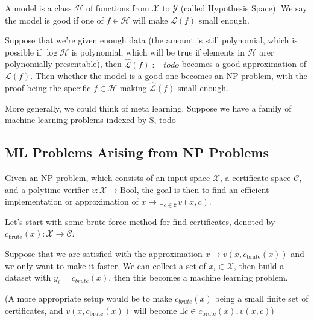 \documentclass[11pt, oneside]{article}   	%
\theoremstyle{definition}
\begin{document}
A model is a class $\mathcal{H}$ of functions from $\mathcal{X}$ to $\mathcal{Y}$ (called Hypothesis Space). We say the model is good if one of $f\in \mathcal{H}$ will make $\mathscr{L}(f)$ small enough.

Suppose that we're given enough data (the amount is still polynomial, which is possible if $\log \mathcal{H}$ is polynomial, which will be true if elements in $\mathcal{H}$ arer polynomially presentable), then $\widehat{\mathscr{L}}(f):=todo$ becomes a good approximation of $\mathscr{L}(f)$. Then whether the model is a good one becomes an NP problem, with the proof being the specific $f\in \mathcal{H}$ making $\widehat{\mathscr{L}}(f)$ small enough.

More generally, we could think of meta learning. Suppose we have a family of machine learning problems indexed by S, todo
\subsection{ML Problems Arising from NP Problems}
\begin{center}
\end{center}

Given an NP problem, which consists of an input space $\mathcal{X}$, a certificate space $\mathcal{C}$, and a polytime verifier $v: \mathcal{X} \rightarrow \text{Bool}$, the goal is then to find an efficient implementation or approximation of $x\mapsto \exists_{c\in \mathcal{C}} v(x,c)$.

Let's start with some brute force method for find certificates, denoted by $c_{\text{brute}}(x): \mathcal{X} \to \mathcal{C}$.

Suppose that we are satisfied with the approximation $x\mapsto v(x,c_{\text{brute}}(x))$ and we only want to make it faster. We can collect a set of $x_i\in \mathcal{X}$, then build a dataset with $y_i=c_{brute}(x)$, then this becomes a machine learning problem.

(A more appropriate setup would be to make $c_{brute}(x)$ being a small finite set of certificates, and $v(x,c_{\text{brute}}(x))$ will become $\exists c\in c_{\text{brute}}(x), v(x, c)$)
\end{document}
